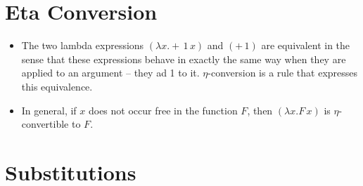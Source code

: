 \documentclass[]{article}
\begin{document}
\section{Eta Conversion}
\begin{itemize}
\item The two lambda expressions $(\lambda x.+\,1\,x)$ and $(+\,1)$ are
equivalent in the sense that these expressions behave in exactly the same way
when they are applied to an argument -- they ad 1 to it. $\eta$-conversion is a
rule that expresses this equivalence.
\item In general, if $x$ does not occur free in the function $F$, then $(\lambda
x.F\,x)$ is $\eta$-convertible to $F$.
\end{itemize}

\section{Substitutions}
\end{document}
